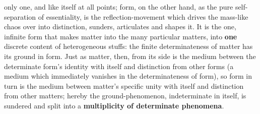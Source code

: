 \documentclass[12pt,a4paper,openany]{book}
\newcommand{\opage}[1]{\marginnote{\footnotesize\textit{[#1]}}}
\begin{document}
only one, and like itself at all points; form, on the other hand,
as the pure self-separation of essentiality, is the
\setcounter{footnote}{0}%
\opage{153}reflection-movement which drives the mass-like chaos over
into distinction, sunders, articulates and shapes it. It is
the one, infinite form that makes matter into the
many particular matters, into \textbf{one} discrete content of
heterogeneous stuffs: the finite determinateness of matter has its
ground in form. Just as matter, then, from its
side is the medium between the determinate form's identity
with itself and distinction from other forms (a medium
which immediately vanishes in the determinateness of form), so
form in turn is the medium between matter's specific
unity with itself and distinction from other matters;
hereby the ground-phenomenon, indeterminate in itself, is sundered
and split into a \textbf{multiplicity of determinate phenomena}.
\end{document}
